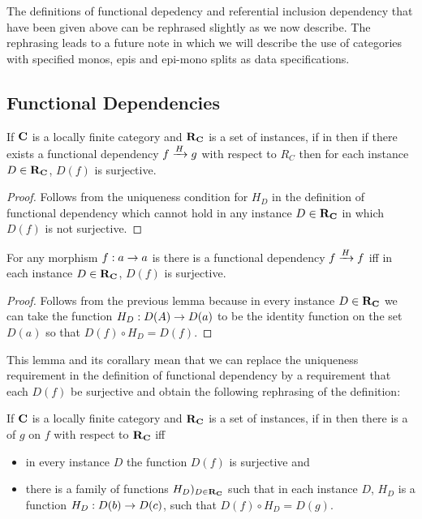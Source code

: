 
The definitions of functional depedency and referential inclusion dependency that have been given above 
can be rephrased slightly as we now describe. The rephrasing leads to a future note in which we will describe the use of categories with specified monos, epis and epi-mono splits as data specifications.
\subsection{Functional Dependencies}
\begin{lemma}
If $\catc$ is a locally finite category and $\reqtc$ is a set of instances, if \fgsourcediag in \catcw
then if there exists a functional dependency $\fundep{H}{f}{g}$  with respect to $R_C$ then
for each instance  $D \in \reqtc$, $D(f)$ is surjective.
\end{lemma}
\begin{proof}
Follows from the uniqueness condition for $H_D$ in the definition of functional dependency which cannot hold in any instance $D \in \reqtc$ in which $D(f)$ is not surjective.
\end{proof}
\begin{corollary}
For any morphism $f:a \morph a$ is \catcw there is a functional dependency $\fundep{H}{f}{f}$ iff
in each instance  $D \in \reqtc$, $D(f)$ is surjective.
\end{corollary}
\begin{proof}
Follows from the previous lemma because in every instance $D \in \reqtc$ 
we can take the function $H_D: D(A) \morph D(a)$ to be the identity function on the set $D(a)$
so that  $D(f) \circ H_D = D(f)$. 
\end{proof}
This lemma and its corallary  mean that we can replace the uniqueness requirement in the 
definition of functional dependency by a requirement that each $D(f)$ be surjective and obtain the following
rephrasing of the definition:
\begin{definition}
If $\catc$ is a locally finite category and $\reqtc$ is a set of instances, if \fgsourcediag in \catcw
then there is a   of $g$ on $f$ with respect to $\reqtc$ iff
\begin{itemize}
\item in every instance $D$ the function $D(f)$ is surjective and
\item
there is a family of functions $H_D)_{D \in \reqtc}$ such that 
in each instance $D$, $H_D$ is a  function $H_D: D(b) \morph D(c)$, 
such that $D(f) \circ H_D = D(g)$. 
\end{itemize}
\end{definition}
